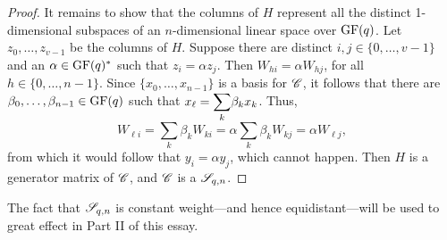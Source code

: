 \documentclass[../../../main]{subfiles}
\begin{document}
\begin{proof}
 It remains to show that the columns of $H$ represent all the distinct 1-dimensional subspaces of an $n$-dimensional linear space over $\text{GF}(q)$. Let $z_0, \dots, z_{v-1}$ be the columns of $H$. Suppose there are distinct $i,j \in \{0,\dots, v-1\}$ and an $\alpha \in \text{GF}(q)^*$ such that $z_i=\alpha z_j$. Then $W_{hi}=\alpha W_{hj}$, for all $h \in \{0, \dots, n-1\}$. Since $\{x_0, \dots, x_{n-1}\}$ is a basis for $\mathscr{C}$, it follows that there are $\beta_0, \dots, \beta_{n-1} \in \text{GF}(q)$ such that $x_\ell = \ssum_k \beta_kx_k$. Thus,
 \[
 W_{\ell i} = \sum_k \beta_k W_{ki} = \alpha\sum_k \beta_k W_{kj} = \alpha W_{\ell j},
 \]
 from which it would follow that $y_i = \alpha y_j$, which cannot happen. Then $H$ is a generator matrix of $\mathscr{C}$, and $\mathscr{C}$ is a $\mathscr{S}_{q,n}$.
\end{proof}

The fact that $\mathscr{S}_{q,n}$ is constant weight---and hence equidistant---will be used to great effect in Part II of this essay.
 
\biblio
\end{document}
